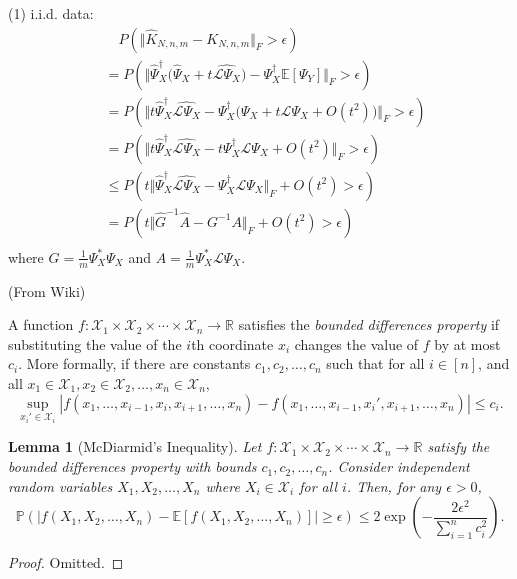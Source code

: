 \documentclass{article}[11]
\newtheorem{lemma}[theorem]{Lemma}
\begin{document}
(1) i.i.d. data:
\begin{align*}
	&\quad P\left(\Vert \widehat{K}_{N,n,m} - K_{N,n,m} \Vert_F > \epsilon \right) \\
	&= P\left(\Vert \widehat{\Psi}_X^{\dagger}\big(\widehat{\Psi}_X + t \widehat{\mathcal{L}\Psi_X} \big) - \Psi_X^{\dagger}\mathbb{E}[\Psi_Y] \Vert_F > \epsilon \right) \\
	&= P\left(\Vert t\widehat{\Psi}_X^{\dagger} \widehat{\mathcal{L}\Psi_X} - \Psi_X^{\dagger} \big(\Psi_X + t\mathcal{L}\Psi_{X} + O(t^2) \big) \Vert_F > \epsilon \right) \\
	&= P\left(\Vert t\widehat{\Psi}_X^{\dagger} \widehat{\mathcal{L}\Psi_X} - t\Psi_X^{\dagger}\mathcal{L}\Psi_{X} + O(t^2) \Vert_F > \epsilon \right) \\
	&\leq P\left( t\Vert \widehat{\Psi}_X^{\dagger} \widehat{\mathcal{L}\Psi_X} - \Psi_X^{\dagger}\mathcal{L}\Psi_{X} \Vert_F + O(t^2) > \epsilon \right) \\
	&= P\left( t\Vert \widehat{G}^{-1} \widehat{A} - G^{-1}A \Vert_F + O(t^2) > \epsilon \right) \\
\end{align*}
where $G = \frac{1}{m}\Psi_X^* \Psi_X$ and $A = \frac{1}{m}\Psi_X^* \mathcal{L}\Psi_{X}$.

(From Wiki)

A function $f : \mathcal{X}_1 \times \mathcal{X}_2 \times \cdots \times \mathcal{X}_n \to \mathbb{R}$ satisfies the \textit{bounded differences property} if substituting the value of the $i$th coordinate $x_i$ changes the value of $f$ by at most $c_i$. More formally, if there are constants $c_1, c_2, \ldots, c_n$ such that for all $i \in [n]$, and all $x_1 \in \mathcal{X}_1, x_2 \in \mathcal{X}_2, \ldots, x_n \in \mathcal{X}_n$,
\[
\sup_{x_i' \in \mathcal{X}_i} |f(x_1, \ldots, x_{i-1}, x_i, x_{i+1}, \ldots, x_n) - f(x_1, \ldots, x_{i-1}, x_i', x_{i+1}, \ldots, x_n)| \leq c_i.
\]


\begin{lemma}[McDiarmid's Inequality]\label{McDiarmid}
	Let $f : \mathcal{X}_1 \times \mathcal{X}_2 \times \cdots \times \mathcal{X}_n \to \mathbb{R}$ satisfy the bounded differences property with bounds $c_1, c_2, \ldots, c_n$. Consider independent random variables $X_1, X_2, \ldots, X_n$ where $X_i \in \mathcal{X}_i$ for all $i$. Then, for any $\epsilon > 0$,
	\[
	\mathbb{P}(|f(X_1, X_2, \ldots, X_n) - \mathbb{E}[f(X_1, X_2, \ldots, X_n)]| \geq \epsilon) \leq 2 \exp\left( - \frac{2\epsilon^2}{\sum_{i=1}^n c_i^2} \right).
	\]
\end{lemma}
\begin{proof}
	Omitted.
\end{proof}
\end{document}

